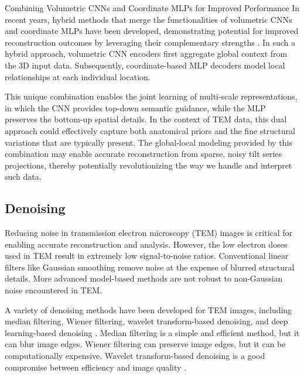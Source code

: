 Combining Volumetric CNNs and Coordinate MLPs for Improved Performance
In recent years, hybrid methods that merge the functionalities of volumetric CNNs and coordinate MLPs have been developed, demonstrating potential for improved reconstruction outcomes by leveraging their complementary strengths \cite{Moawad2020} \cite{Zhang2017}. In such a hybrid approach, volumetric CNN encoders first aggregate global context from the 3D input data. Subsequently, coordinate-based MLP decoders model local relationships at each individual location.
\vspace{10pt}

This unique combination enables the joint learning of multi-scale representations, in which the CNN provides top-down semantic guidance, while the MLP preserves the bottom-up spatial details. In the context of TEM data, this dual approach could effectively capture both anatomical priors and the fine structural variations that are typically present. The global-local modeling provided by this combination may enable accurate reconstruction from sparse, noisy tilt series projections, thereby potentially revolutionizing the way we handle and interpret such data.


\clearpage
\subsection{Denoising}

Reducing noise in transmission electron microscopy (TEM) images is critical for enabling accurate reconstruction and analysis. However, the low electron doses used in TEM result in extremely low signal-to-noise ratios. Conventional linear filters like Gaussian smoothing remove noise at the expense of blurred structural details. More advanced model-based methods are not robust to non-Gaussian noise encountered in TEM.
\vspace{10pt}

A variety of denoising methods have been developed for TEM images, including median filtering, Wiener filtering, wavelet transform-based denoising, and deep learning-based denoising \cite{6168375}. Median filtering is a simple and efficient method, but it can blur image edges. Wiener filtering can preserve image edges, but it can be computationally expensive. Wavelet transform-based denoising is a good compromise between efficiency and image quality \cite{6168375}. 
\vspace{10pt}

